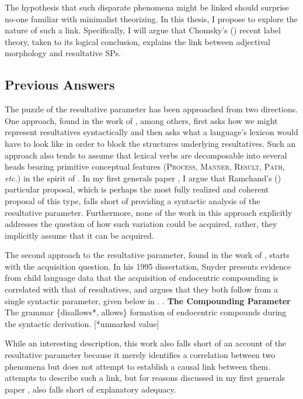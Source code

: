 \documentclass[letterpaper,12pt]{article}
\begin{document}
The hypothesis that such disparate phenomena might be linked should surprise no-one familiar with minimalist theorizing.
In this thesis, I propose to explore the nature of such a link.
Specifically, I will argue that Chomsky's (\citeyear{chomsky2013problems,chomsky2015problems}) recent label theory, taken to its logical conclusion, explains the link between adjectival morphology and resultative SPs.


\subsection{Previous Answers}
The puzzle of the resultative parameter has been approached from two directions.
One approach, found in the work of \textcite{harley2005how,folli2006licensing,ramchand2008verb,tungseth2008verbal}, among others, first asks how we might represent resultatives syntactically and then asks what a language's lexicon would have to look like in order to block the structures underlying resultatives.
Such an approach also tends to assume that lexical verbs are decomposable into several heads bearing primitive conceptual features (\textsc{Process}, \textsc{Manner}, \textsc{Result}, \textsc{Path}, \textit{etc.}) in the spirit of \textcite{hale1993argument}.
In my first generals paper \parencite[][pp 30-32]{milway2015generals}, I argue that Ramchand's (\citeyear{ramchand2008verb}) particular proposal, which is perhaps the most fully realized and coherent proposal of this type, falls short of providing a syntactic analysis of the resultative parameter.
Furthermore, none of the work in this approach explicitly addresses the question of how such variation could be acquired, rather, they implicitly assume that it can be acquired.

The second approach to the resultative parameter, found in the work of \textcite{snyder1995language,snyder2001nature,roeper2002learnability,beck2001complex}, starts with the acquisition question.
In his 1995 dissertation, Snyder presents evidence from child language data that the acquisition of endocentric compounding is correlated with that of resultatives, and argues that they both follow from a single syntactic parameter, given below in \Next.
\ex. \textbf{The Compounding Parameter} \parencite{snyder2001nature}\\ 
The grammar \{disallows*, allows\} formation of endocentric compounds during the syntactic derivation. [*unmarked value] 

While an interesting description, this work also falls short of an account of the resultative parameter because it merely identifies a correlation between two phenomena but does not attempt to establish a causal link between them.
\textcite{kratzer_building_2004} attempts to describe such a link, but for reasons discussed in my first generals paper \parencite[][pp 32-34]{milway2015generals}, also falls short of explanatory adequacy.
\end{document}
